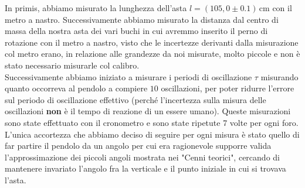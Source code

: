 \documentclass{article}
\begin{document}
In primis, abbiamo misurato la lunghezza dell'asta $l = (105,0 \pm 0.1) \,  \text{cm}$ con il metro a nastro. Successivamente abbiamo misurato la distanza dal centro di massa della nostra asta dei vari buchi in cui avremmo inserito il perno di rotazione con il metro a nastro, visto che le incertezze derivanti dalla misurazione col metro erano, in relazione alle grandezze da noi misurate, molto piccole e non è stato necessario misurarle col calibro. \\
Successivamente abbiamo iniziato a misurare i periodi di oscillazione $\tau$ misurando quanto occorreva al pendolo a compiere $10$ oscillazioni, per poter ridurre l'errore sul periodo di oscillazione effettivo (perché l'incertezza sulla misura delle oscillazioni \textbf{non} è il tempo di reazione di un essere umano). Queste misurazioni sono state effettuato con il cronometro e sono state ripetute 7 volte per ogni foro. \\
L'unica accortezza che abbiamo deciso di seguire per ogni misura è stato quello di far partire il pendolo da un angolo per cui era ragionevole supporre valida l'approssimazione dei piccoli angoli mostrata nei "Cenni teorici", cercando di mantenere invariato l'angolo fra la verticale e il punto iniziale in cui si trovava l'asta.
\end{document}
